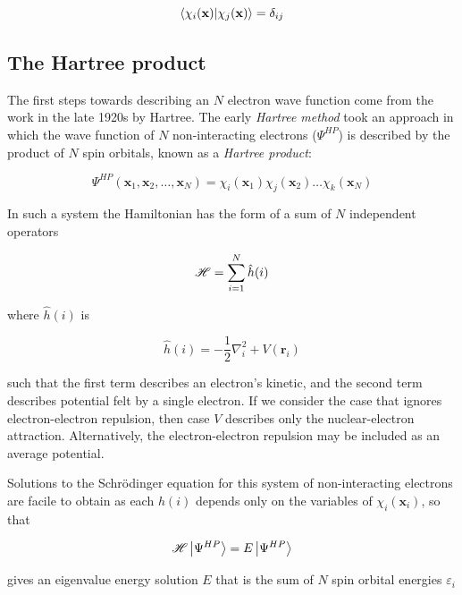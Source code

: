 \begin{equation}
\bra{\chi_i(\mathbf{x})}\ket{\chi_j(\mathbf{x})} = \delta_{ij}
\end{equation}

\subsection{The Hartree product}

The first steps towards describing an $N$ electron wave function come from the
work in the late 1920s by Hartree. The early \emph{Hartree method} took an
approach in which the wave function of $N$ non-interacting electrons
($\Psi^{HP}$) is described by the product of $N$ spin orbitals, known as a
\emph{Hartree product}:

\begin{equation}
\Psi^{HP}(\mathbf{x}_1,\mathbf{x}_2,\ldots,\mathbf{x}_N) = \chi_i(\mathbf{x}_1)\chi_j(\mathbf{x}_2)\dots\chi_k(\mathbf{x}_N)
\end{equation}

\noindent In such a system the Hamiltonian has the form of a sum of $N$
independent operators

\begin{equation}
  \mathscr{H} = \sum_{i=1}^N \hat{h}(i)
\end{equation}

\noindent where $\hat{h}(i)$ is

\begin{equation}
  \hat{h}(i) = -\frac{1}{2} \nabla_i^2 + V(\mathbf{r}_i)
\end{equation}

\noindent such that the first term describes an electron's kinetic, and the
second term describes potential felt by a single electron. If we consider the
case that ignores electron-electron repulsion, then case $V$ describes only
the nuclear-electron attraction. Alternatively, the electron-electron repulsion
may be included as an average potential.

Solutions to the Schr{\"o}dinger equation for this system of non-interacting
electrons are facile to obtain as each $h(i)$ depends only on the variables of
$\chi_i(\mathbf{x}_i)$, so that

\begin{equation}
  \mathscr{H} \ket{\Psi^{HP}} = E \ket{\Psi^{HP}}
\end{equation}

\noindent gives an eigenvalue energy solution $E$ that is the sum of $N$ spin
orbital energies $\varepsilon_i$

